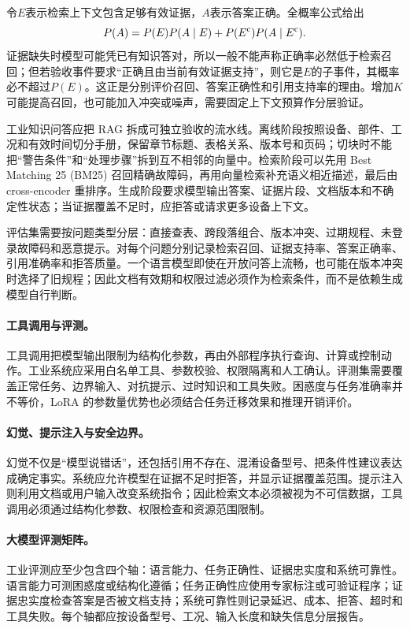 令$E$表示检索上下文包含足够有效证据，$A$表示答案正确。全概率公式给出
\begin{equation}
 P(A)=P(E)P(A\mid E)+P(E^{\rm c})P(A\mid E^{\rm c}).
\end{equation}
证据缺失时模型可能凭已有知识答对，所以一般不能声称正确率必然低于检索召回；但若验收事件要求“正确且由当前有效证据支持”，则它是$E$的子事件，其概率必不超过$P(E)$。这正是分别评价召回、答案正确性和引用支持率的理由。增加$K$可能提高召回，也可能加入冲突或噪声，需要固定上下文预算作分层验证。

工业知识问答应把 RAG 拆成可独立验收的流水线。离线阶段按照设备、部件、工况和有效时间切分手册，保留章节标题、表格关系、版本号和页码；切块时不能把“警告条件”和“处理步骤”拆到互不相邻的向量中。检索阶段可以先用 Best Matching 25 (BM25) 召回精确故障码，再用向量检索补充语义相近描述，最后由 cross-encoder 重排序。生成阶段要求模型输出答案、证据片段、文档版本和不确定性状态；当证据覆盖不足时，应拒答或请求更多设备上下文。

评估集需要按问题类型分层：直接查表、跨段落组合、版本冲突、过期规程、未登录故障码和恶意提示。对每个问题分别记录检索召回、证据支持率、答案正确率、引用准确率和拒答质量。一个语言模型即使在开放问答上流畅，也可能在版本冲突时选择了旧规程；因此文档有效期和权限过滤必须作为检索条件，而不是依赖生成模型自行判断。

\paragraph{工具调用与评测。}
工具调用把模型输出限制为结构化参数，再由外部程序执行查询、计算或控制动作。工业系统应采用白名单工具、参数校验、权限隔离和人工确认。评测集需要覆盖正常任务、边界输入、对抗提示、过时知识和工具失败。困惑度与任务准确率并不等价，LoRA 的参数量优势也必须结合任务迁移效果和推理开销评价。

\paragraph{幻觉、提示注入与安全边界。}
幻觉不仅是“模型说错话”，还包括引用不存在、混淆设备型号、把条件性建议表达成确定事实。系统应允许模型在证据不足时拒答，并显示证据覆盖范围。提示注入则利用文档或用户输入改变系统指令；因此检索文本必须被视为不可信数据，工具调用必须通过结构化参数、权限检查和资源范围限制。

\paragraph{大模型评测矩阵。}
工业评测应至少包含四个轴：语言能力、任务正确性、证据忠实度和系统可靠性。语言能力可测困惑度或结构化遵循；任务正确性应使用专家标注或可验证程序；证据忠实度检查答案是否被文档支持；系统可靠性则记录延迟、成本、拒答、超时和工具失败。每个轴都应按设备型号、工况、输入长度和缺失信息分层报告。

